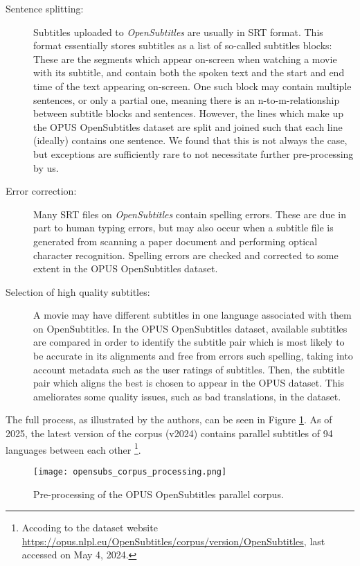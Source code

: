\begin{description}
	\item [Sentence splitting:]
	      Subtitles uploaded to \textit{OpenSubtitles} are usually in SRT format.
	      This format essentially stores subtitles as a list of so-called subtitles blocks:
	      These are the segments which appear on-screen when watching a movie with its subtitle, and contain both the spoken text and the start and end time of the text appearing on-screen.
	      One such block may contain multiple sentences, or only a partial one, meaning there is an n-to-m-relationship between subtitle blocks and sentences.
	      However, the lines which make up the OPUS OpenSubtitles dataset are split and joined such that each line (ideally) contains one sentence.
	      We found that this is not always the case, but exceptions are sufficiently rare to not necessitate further pre-processing by us.
	\item [Error correction:] Many SRT files on \textit{OpenSubtitles} contain spelling errors.
	      These are due in part to human typing errors, but may also occur when a subtitle file is generated from scanning a paper document and performing optical character recognition.
	      Spelling errors are checked and corrected to some extent in the OPUS OpenSubtitles dataset.
	\item [Selection of high quality subtitles:]
	      A movie may have different subtitles in one language associated with them on OpenSubtitles.
	      In the OPUS OpenSubtitles dataset, available subtitles are compared in order to identify the subtitle pair which is most likely to be accurate in its alignments and free from errors such spelling, taking into account metadata such as the user ratings of subtitles.
	      Then, the subtitle pair which aligns the best is chosen to appear in the OPUS dataset.
	      This ameliorates some quality issues, such as bad translations, in the dataset.
\end{description}

The full process, as illustrated by the authors, can be seen in Figure \ref{fig:opensubtitles-pipeline}.
As of 2025, the latest version of the corpus (v2024) contains parallel subtitles of 94 languages between each other \footnote{Accoding to the dataset website \url{https://opus.nlpl.eu/OpenSubtitles/corpus/version/OpenSubtitles}, last accessed on May 4, 2024.}.

\begin{figure}[ht]
	\centering
	\texttt{[image: opensubs\_corpus\_processing.png]}
	\caption{Pre-processing of the OPUS OpenSubtitles parallel corpus.}
	\label{fig:opensubtitles-pipeline}
\end{figure}

